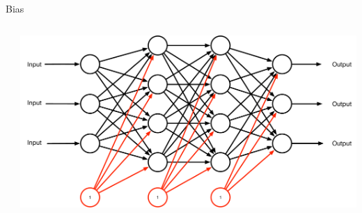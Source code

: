 \documentclass[aspectratio=169]{beamer}
\begin{document}
\begin{frame}{Bias}
\begin{columns}
\begin{column}{0.6\textwidth}
{{\begin{itemize}
\end{itemize}
}}
\end{column}
\begin{column}{0.4\textwidth}
\includegraphics[width=1\textwidth]{lectFF/biasNN.pdf}
\end{column}
\end{columns}
\end{frame}
\end{document}
